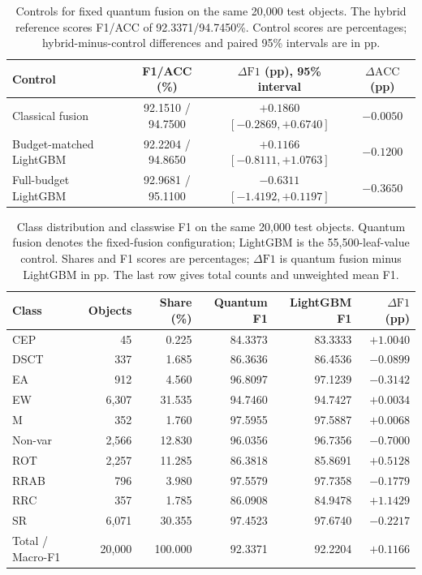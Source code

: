 \documentclass[aps,a4paper,onecolumn,11pt,unpublished]{quantumarticle}
\newcommand{\dF}{\Delta\mathrm{F1}}
\newcommand{\dA}{\Delta\mathrm{ACC}}
\begin{document}
\begin{table}[htbp]
\centering
\small
\setlength{\tabcolsep}{4pt}
\caption{Controls for fixed quantum fusion on the same 20{,}000 test objects. The hybrid reference scores F1/ACC of 92.3371/94.7450\%. Control scores are percentages; hybrid-minus-control differences and paired 95\% intervals are in pp.}
\label{tab:leafbudget}
\begin{tabular}{@{}lccc@{}}
\toprule
Control & F1/ACC (\%) & $\dF$ (pp), 95\% interval & $\dA$ (pp) \\
\midrule
Classical fusion & 92.1510 / 94.7500 & $+0.1860$ $[-0.2869,+0.6740]$ & $-0.0050$ \\
Budget-matched LightGBM & 92.2204 / 94.8650 & $+0.1166$ $[-0.8111,+1.0763]$ & $-0.1200$ \\
Full-budget LightGBM & 92.9681 / 95.1100 & $-0.6311$ $[-1.4192,+0.1197]$ & $-0.3650$ \\
\bottomrule
\end{tabular}
\end{table}

\begin{table}[htbp]
\centering
\small
\setlength{\tabcolsep}{5pt}
\caption{Class distribution and classwise F1 on the same 20{,}000 test objects. Quantum fusion denotes the fixed-fusion configuration; LightGBM is the 55{,}500-leaf-value control. Shares and F1 scores are percentages; $\dF$ is quantum fusion minus LightGBM in pp. The last row gives total counts and unweighted mean F1.}
\label{tab:classwise}
\begin{tabular}{@{}lrrrrr@{}}
\toprule
Class & Objects & Share (\%) & Quantum F1 & LightGBM F1 & $\dF$ (pp) \\
\midrule
CEP & 45 & 0.225 & 84.3373 & 83.3333 & $+1.0040$ \\
DSCT & 337 & 1.685 & 86.3636 & 86.4536 & $-0.0899$ \\
EA & 912 & 4.560 & 96.8097 & 97.1239 & $-0.3142$ \\
EW & 6{,}307 & 31.535 & 94.7460 & 94.7427 & $+0.0034$ \\
M & 352 & 1.760 & 97.5955 & 97.5887 & $+0.0068$ \\
Non-var & 2{,}566 & 12.830 & 96.0356 & 96.7356 & $-0.7000$ \\
ROT & 2{,}257 & 11.285 & 86.3818 & 85.8691 & $+0.5128$ \\
RRAB & 796 & 3.980 & 97.5579 & 97.7358 & $-0.1779$ \\
RRC & 357 & 1.785 & 86.0908 & 84.9478 & $+1.1429$ \\
SR & 6{,}071 & 30.355 & 97.4523 & 97.6740 & $-0.2217$ \\
\midrule
Total / Macro-F1 & 20{,}000 & 100.000 & 92.3371 & 92.2204 & $+0.1166$ \\
\bottomrule
\end{tabular}
\end{table}
\end{document}
